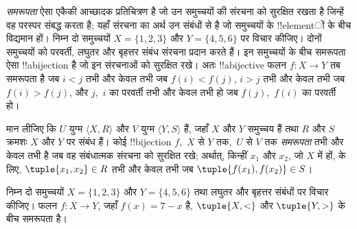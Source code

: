 \documentclass[../../../include/open-logic-section]{subfiles}
\begin{document}

\begin{explain}
\emph{समरूपता} ऐसा एकैकी आच्छादक प्रतिचित्रण है जो उन समुच्चयों की संरचना को
सुरक्षित रखता है जिन्हें वह परस्पर संबद्ध करता है; यहाँ संरचना का अर्थ उन
संबंधों से है जो समुच्चयों के !!{element}ों के बीच विद्यमान हों। निम्न दो
समुच्चयों $X=\{1,2,3\}$ और $Y=\{4,5,6\}$ पर विचार कीजिए। दोनों समुच्चयों को
परवर्ती, लघुतर और बृहत्तर संबंध संरचना प्रदान करते हैं। इन समुच्चयों के बीच
समरूपता ऐसा !!a{bijection} है जो इन संरचनाओं को सुरक्षित रखे। अतः !!a{bijective}
फलन $f \colon X
\to Y$ तब समरूपता है जब $i<j$ तभी और केवल तभी जब
$f(i)<f(j)$, $i>j$ तभी और केवल तभी जब $f(i)>f(j)$, और $j$,~$i$ का परवर्ती
तभी और केवल तभी हो जब $f(j)$,~$f(i)$ का परवर्ती हो।
\end{explain}

\begin{defn}[समरूपता]
मान लीजिए कि $U$ युग्म $\langle X, R\rangle$ और $V$ युग्म $\langle
Y, S\rangle$ हैं, जहाँ $X$ और $Y$ समुच्चय हैं तथा $R$ और $S$ क्रमशः $X$ और
$Y$ पर संबंध हैं। कोई !!{bijection} $f$,~$X$ से $Y$ तक,~$U$ से $V$ तक
\emph{समरूपता} तभी और केवल तभी है जब वह संबंधात्मक संरचना को सुरक्षित रखे;
अर्थात्, किन्हीं $x_{1}$ और $x_{2}$, जो $X$ में हों, के लिए,
$\tuple{x_1,x_2} \in R$ तभी और केवल तभी जब
$\tuple{f(x_1),f(x_2)} \in S$।
\end{defn}

\begin{ex}
निम्न दो समुच्चयों $X=\{1,2,3\}$ और $Y=\{4,5,6\}$ तथा लघुतर और बृहत्तर
संबंधों पर विचार कीजिए। फलन $f\colon X \to
Y$, जहाँ $f(x) = 7-x$ है, $\tuple{X,<}$ और $\tuple{Y,>}$ के बीच समरूपता
है।
\end{ex}
\end{document}
